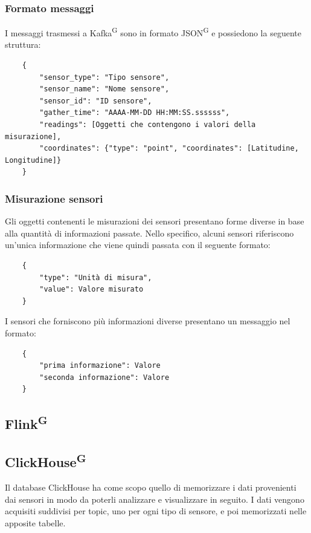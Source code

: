 \documentclass[8pt]{article}
\newcommand{\glossterm}[1]{#1\textsuperscript{G}} %
\begin{document}
\subsubsection{Formato messaggi}
I messaggi trasmessi a \glossterm{Kafka} sono in formato \glossterm{JSON} e possiedono la seguente struttura:
\begin{verbatim}
    {
        "sensor_type": "Tipo sensore",
        "sensor_name": "Nome sensore",
        "sensor_id": "ID sensore",
        "gather_time": "AAAA-MM-DD HH:MM:SS.ssssss",
        "readings": [Oggetti che contengono i valori della misurazione],
        "coordinates": {"type": "point", "coordinates": [Latitudine, Longitudine]}
    }
\end{verbatim}
\subsubsection{Misurazione sensori}
Gli oggetti contenenti le misurazioni dei sensori presentano forme diverse in base alla quantità di informazioni passate. Nello specifico, alcuni sensori riferiscono un'unica informazione che viene quindi passata con il seguente formato:
\begin{verbatim}
    {
        "type": "Unità di misura", 
        "value": Valore misurato
    }
\end{verbatim}
I sensori che forniscono più informazioni diverse presentano un messaggio nel formato:
\begin{verbatim}
    {
        "prima informazione": Valore
        "seconda informazione": Valore
    }
\end{verbatim}
\subsection{\glossterm{Flink}}
\subsection{\glossterm{ClickHouse}}
Il database ClickHouse ha come scopo quello di memorizzare i dati provenienti dai sensori in modo da poterli analizzare e visualizzare in seguito. I dati vengono acquisiti suddivisi per topic, uno per ogni tipo di sensore, e poi memorizzati nelle apposite tabelle.
\end{document}
